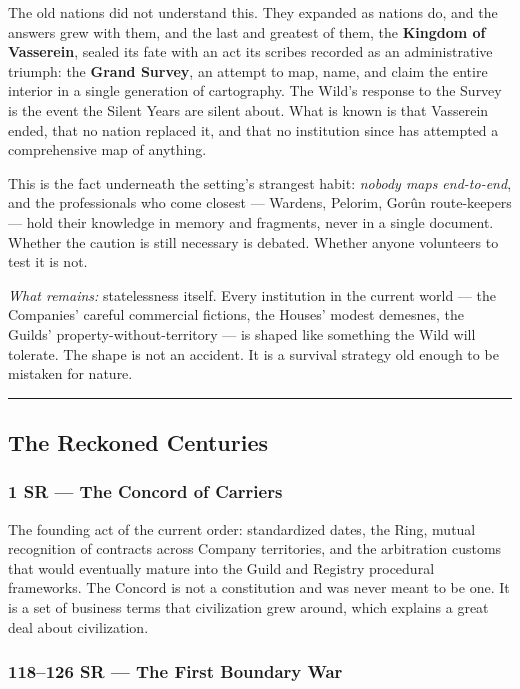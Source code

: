 The old nations did not understand this. They expanded as nations do, and the answers grew with them, and the last and greatest of them, the \textbf{Kingdom of Vasserein}, sealed its fate with an act its scribes recorded as an administrative triumph: the \textbf{Grand Survey}, an attempt to map, name, and claim the entire interior in a single generation of cartography. The Wild's response to the Survey is the event the Silent Years are silent about. What is known is that Vasserein ended, that no nation replaced it, and that no institution since has attempted a comprehensive map of anything.

This is the fact underneath the setting's strangest habit: \textit{nobody maps end-to-end}, and the professionals who come closest --- Wardens, Pelorim, Gorûn route-keepers --- hold their knowledge in memory and fragments, never in a single document. Whether the caution is still necessary is debated. Whether anyone volunteers to test it is not.

\textit{What remains:} statelessness itself. Every institution in the current world --- the Companies' careful commercial fictions, the Houses' modest demesnes, the Guilds' property-without-territory --- is shaped like something the Wild will tolerate. The shape is not an accident. It is a survival strategy old enough to be mistaken for nature.

\medskip\hrule\medskip

\subsection{The Reckoned Centuries}

\subsubsection{1 SR --- The Concord of Carriers}

The founding act of the current order: standardized dates, the Ring, mutual recognition of contracts across Company territories, and the arbitration customs that would eventually mature into the Guild and Registry procedural frameworks. The Concord is not a constitution and was never meant to be one. It is a set of business terms that civilization grew around, which explains a great deal about civilization.

\subsubsection{118--126 SR --- The First Boundary War}

